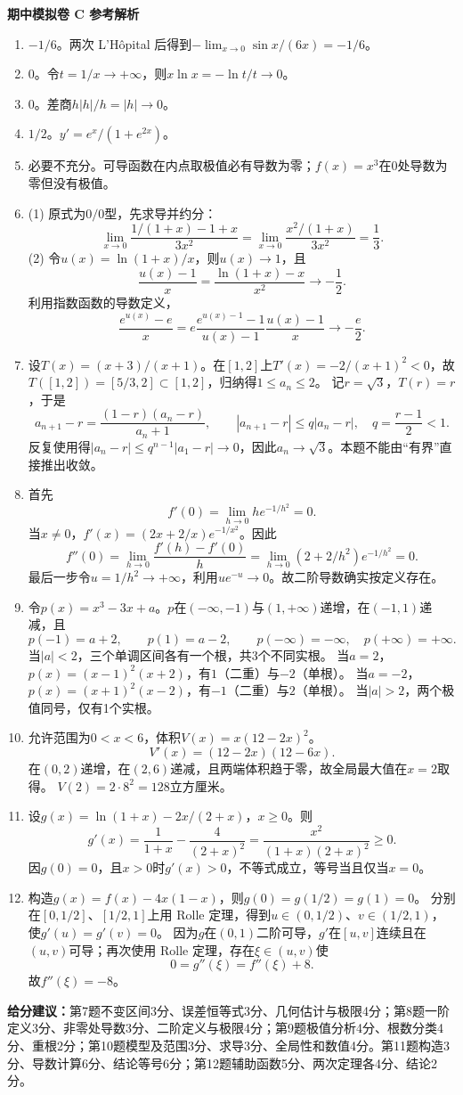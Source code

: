\documentclass[11pt,a4paper,fontset=fandol]{ctexart}
\newcommand{\answerpaper}[1]{\clearpage\begin{center}{\LARGE\bfseries #1}\end{center}}
\begin{document}
\answerpaper{期中模拟卷 C 参考解析}
\begin{enumerate}
\item $-1/6$。两次 L'Hôpital 后得到$-\lim_{x\to0}\sin x/(6x)=-1/6$。
\item $0$。令$t=1/x\to+\infty$，则$x\ln x=-\ln t/t\to0$。
\item $0$。差商$h|h|/h=|h|\to0$。
\item $1/2$。$y'=e^x/(1+e^{2x})$。
\item 必要不充分。可导函数在内点取极值必有导数为零；$f(x)=x^3$在$0$处导数为零但没有极值。
\item (1) 原式为$0/0$型，先求导并约分：
\[\lim_{x\to0}\frac{1/(1+x)-1+x}{3x^2}
=\lim_{x\to0}\frac{x^2/(1+x)}{3x^2}=\frac13.\]
(2) 令$u(x)=\ln(1+x)/x$，则$u(x)\to1$，且
\[\frac{u(x)-1}{x}=\frac{\ln(1+x)-x}{x^2}\longrightarrow-\frac12.\]
利用指数函数的导数定义，
\[\frac{e^{u(x)}-e}{x}
=e\frac{e^{u(x)-1}-1}{u(x)-1}\frac{u(x)-1}{x}
\longrightarrow-\frac e2.\]
\item 设$T(x)=(x+3)/(x+1)$。在$[1,2]$上$T'(x)=-2/(x+1)^2<0$，故$T([1,2])=[5/3,2]\subset[1,2]$，归纳得$1\le a_n\le2$。
记$r=\sqrt3$，$T(r)=r$，于是
\[a_{n+1}-r=\frac{(1-r)(a_n-r)}{a_n+1},\qquad
|a_{n+1}-r|\le q|a_n-r|,\quad q=\frac{r-1}{2}<1.\]
反复使用得$|a_n-r|\le q^{n-1}|a_1-r|\to0$，因此$a_n\to\sqrt3$。本题不能由“有界”直接推出收敛。
\item 首先
\[f'(0)=\lim_{h\to0}h e^{-1/h^2}=0.\]
当$x\ne0$，$f'(x)=(2x+2/x)e^{-1/x^2}$。因此
\[f''(0)=\lim_{h\to0}\frac{f'(h)-f'(0)}h
=\lim_{h\to0}(2+2/h^2)e^{-1/h^2}=0.\]
最后一步令$u=1/h^2\to+\infty$，利用$u e^{-u}\to0$。故二阶导数确实按定义存在。
\item 令$p(x)=x^3-3x+a$。$p$在$(-\infty,-1)$与$(1,+\infty)$递增，在$(-1,1)$递减，且
\[p(-1)=a+2,\qquad p(1)=a-2,\qquad
p(-\infty)=-\infty,\quad p(+\infty)=+\infty.\]
当$|a|<2$，三个单调区间各有一个根，共3个不同实根。
当$a=2$，$p(x)=(x-1)^2(x+2)$，有$1$（二重）与$-2$（单根）。
当$a=-2$，$p(x)=(x+1)^2(x-2)$，有$-1$（二重）与$2$（单根）。
当$|a|>2$，两个极值同号，仅有1个实根。
\item 允许范围为$0<x<6$，体积$V(x)=x(12-2x)^2$。
\[V'(x)=(12-2x)(12-6x).\]
在$(0,2)$递增，在$(2,6)$递减，且两端体积趋于零，故全局最大值在$x=2$取得。
$V(2)=2\cdot8^2=128$立方厘米。
\item 设$g(x)=\ln(1+x)-2x/(2+x)$，$x\ge0$。则
\[g'(x)=\frac1{1+x}-\frac4{(2+x)^2}
=\frac{x^2}{(1+x)(2+x)^2}\ge0.\]
因$g(0)=0$，且$x>0$时$g'(x)>0$，不等式成立，等号当且仅当$x=0$。
\item 构造$g(x)=f(x)-4x(1-x)$，则$g(0)=g(1/2)=g(1)=0$。
分别在$[0,1/2]$、$[1/2,1]$上用 Rolle 定理，得到$u\in(0,1/2)$、$v\in(1/2,1)$，使$g'(u)=g'(v)=0$。
因为$g$在$(0,1)$二阶可导，$g'$在$[u,v]$连续且在$(u,v)$可导；再次使用 Rolle 定理，存在$\xi\in(u,v)$使
\[0=g''(\xi)=f''(\xi)+8.\]
故$f''(\xi)=-8$。
\end{enumerate}
\textbf{给分建议：}第7题不变区间3分、误差恒等式3分、几何估计与极限4分；第8题一阶定义3分、非零处导数3分、二阶定义与极限4分；第9题极值分析4分、根数分类4分、重根2分；第10题模型及范围3分、求导3分、全局性和数值4分。第11题构造3分、导数计算6分、结论等号6分；第12题辅助函数5分、两次定理各4分、结论2分。
\end{document}
